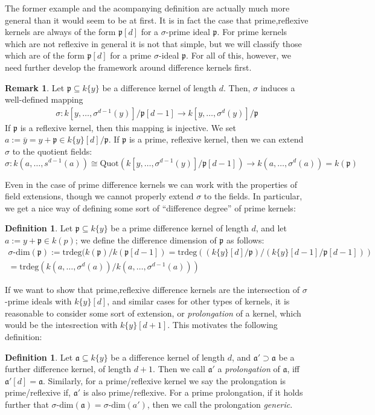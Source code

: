 \documentclass{article}
\def\a{\mathfrak{a}}
\def\p{\mathfrak{p}}
\def\s{\sigma}
\def\sdim{\sigma\text{-dim}}
\theoremstyle{definition}
\newtheorem{rem}[Satz]{Remark}
\newtheorem{defn}[Satz]{Definition}
\begin{document}
The former example and the acompanying definition are actually much more general than it would seem to be at first. 
It is in fact the case that prime,reflexive kernels are always of the form $\p[d]$ for a $\s$-prime ideal $\p$.
For prime kernels which are not reflexive in general it is not that simple, but we will classify those which are of the form $\p[d]$ for a prime $\s$-ideal $\p$.
For all of this, however, we need further develop the framework around difference kernels first.

\begin{rem}\label{sigmawelldeffker}
Let $\p \subseteq k\{y\}$ be a difference kernel of length $d$. Then, $\s$ induces a well-defined mapping 
\begin{align*}
\s: k[y,\ldots,\s^{d-1}(y)]/\p[d-1] \rightarrow k[y,\ldots,\s^{d}(y)]/\p
\end{align*}
If $\p$ is a reflexive kernel, then this mapping is injective. 
We set $a := \bar y = y + \p \in k\{y\}[d]/\p$. If $\p$ is a prime, reflexive kernel, then we can extend $\s$ to the quotient fields:
\[ \s: k(a,\ldots,s^{d-1}(a)) \cong \text{Quot}(k[y,\ldots,\s^{d-1}(y)]/\p[d-1]) \rightarrow k(a,\ldots,\s^d(a)) = k(\p) \]
\end{rem}

Even in the case of prime difference kernels we can work with the properties of field extensions, though we cannot properly extend $\s$ to the fields.
 In particular, we get a nice way of defining some sort of ``difference degree'' of prime kernels:
\begin{defn}
Let $\p \subseteq k\{y\}$ be a prime difference kernel of length $d$, and let $a:= y + \p \in k(p)$; we define the difference dimension of $\p$ as follows:
\begin{align*} \sdim(\p) := \text{trdeg}(k(\p)/k(\p[d-1]) = \text{trdeg}((k\{y\}[d]/\p)/(k\{y\}[d-1]/\p[d-1])) \\  = \text{trdeg}(k(a,\ldots,\s^{d}(a))/k(a,\ldots,\s^{d-1}(a))) \end{align*}
\end{defn}\index{$\s$-dimension of a $\s$-kernel}

If we want to show that prime,reflexive difference kernels are the intersection of $\s$-prime ideals with $k\{y\}[d]$, and similar cases for other types of kernels,
it is reasonable to consider some sort of extension, or \emph{prolongation} of a kernel, which would be the intesrection with $k\{y\}[d+1]$. 
This motivates the following definition:

\begin{defn}
Let $\a \subseteq k\{y\}$ be a difference kernel of length $d$, and $\a' \supset \a$ be a further difference kernel, of length $d+1$.
Then we call $\a'$ a \emph{prolongation} of $\a$, iff $\a'[d] = \a$. Similarly, for a prime/reflexive kernel we say the prolongation is prime/reflexive if, $\a'$ is also prime/reflexive.
For a prime prolongation, if it holds further that $\sdim(\a) = \sdim(a')$, then we call the prolongation \emph{generic}.
\end{defn}
\end{document}
